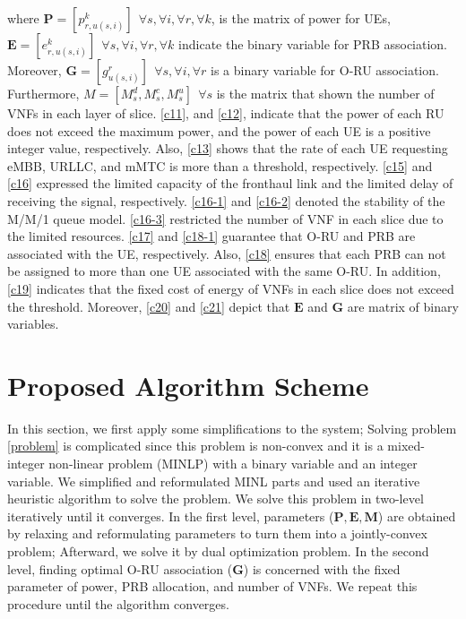 \documentclass[conference]{IEEEtran}
\begin{document}
where $\boldsymbol{P} =[p_{r,u(s,i)}^{k}] \:\: \forall s , \forall i, \forall r, \forall k $, is the matrix of power for UEs, $\boldsymbol{E} =[e_{r,u(s,i)}^k] \:\: \forall s , \forall i, \forall r, \forall k$ indicate the binary variable for PRB association. Moreover, $\boldsymbol{G} =[g_{u(s,i)}^r] \:\: \forall s , \forall i, \forall r$ is a binary variable for O-RU association. Furthermore, $M = [M_s^d, M_s^c, M_s^u] \:\: \forall s$ is the matrix that shown the number of VNFs in each layer of slice.
\eqref{c11}, and \eqref{c12}, indicate that the power of each RU does not exceed the maximum power, and the power of each UE is a positive integer value, respectively.  
Also, \eqref{c13} shows that the rate of each UE requesting eMBB, URLLC, and mMTC is more than a threshold, respectively.
\eqref{c15} and \eqref{c16} expressed the limited capacity of the fronthaul link and the limited delay of receiving the signal, respectively.
\eqref{c16-1} and \eqref{c16-2} denoted the stability of the M/M/1 queue model.
\eqref{c16-3} restricted the number of VNF in each slice due to the limited resources.
\eqref{c17} and \eqref{c18-1} guarantee that O-RU and PRB are associated with the UE, respectively.
Also, \eqref{c18} ensures that each PRB can not be assigned to more than one UE associated with the same O-RU.
In addition, \eqref{c19} indicates that the fixed cost of energy of VNFs in each slice does not exceed the threshold. 
Moreover, \eqref{c20} and \eqref{c21} depict that $\boldsymbol{E}$ and $\boldsymbol{G}$ are matrix of binary variables.
\section{Proposed Algorithm Scheme}\label{proAlg}
In this section, we first apply some simplifications to the system; Solving problem \eqref{problem} is complicated since this problem is non-convex and it is a  mixed-integer non-linear problem (MINLP) with a binary variable and an integer variable. 
We simplified and reformulated MINL parts and used an iterative heuristic algorithm to solve the problem.
We solve this problem in two-level iteratively until it converges. In the first level, parameters ($\boldsymbol{P}, \boldsymbol{E}, \boldsymbol{M}$) are obtained by relaxing and reformulating parameters to turn them into a jointly-convex problem; Afterward, we solve it by dual optimization problem.
In the second level, finding optimal O-RU association ($ \boldsymbol{G}$) is concerned with the fixed parameter of power, PRB allocation, and number of VNFs.   
We repeat this procedure until the algorithm converges.
\end{document}
